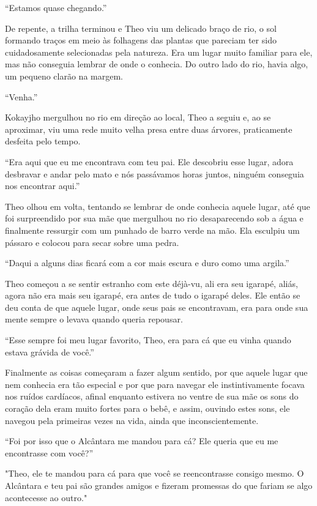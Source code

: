 ``Estamos quase chegando.''

De repente, a trilha terminou e Theo viu um delicado braço de rio, o sol
formando traços em meio às folhagens das plantas que pareciam ter sido
cuidadosamente selecionadas pela natureza. Era um lugar muito familiar
para ele, mas não conseguia lembrar de onde o conhecia. Do outro lado do
rio, havia algo, um pequeno clarão na margem.

``Venha.''

Kokayjho mergulhou no rio em direção ao local, Theo a seguiu e, ao se
aproximar, viu uma rede muito velha presa entre duas árvores,
praticamente desfeita pelo tempo.

``Era aqui que eu me encontrava com teu pai. Ele descobriu esse lugar,
adora desbravar e andar pelo mato e nós passávamos horas juntos, ninguém
conseguia nos encontrar aqui.''

Theo olhou em volta, tentando se lembrar de onde conhecia aquele lugar,
até que foi surpreendido por sua mãe que mergulhou no rio desaparecendo
sob a água e finalmente ressurgir com um punhado de barro verde na mão.
Ela esculpiu um pássaro e colocou para secar sobre uma pedra.

``Daqui a alguns dias ficará com a cor mais escura e duro como uma
argila.''

Theo começou a se sentir estranho com este déjà-vu, ali era seu igarapé,
aliás, agora não era mais seu igarapé, era antes de tudo o igarapé
deles. Ele então se deu conta de que aquele lugar, onde seus pais se
encontravam, era para onde sua mente sempre o levava quando queria
repousar.

``Esse sempre foi meu lugar favorito, Theo, era para cá que eu vinha
quando estava grávida de você.''

Finalmente as coisas começaram a fazer algum sentido, por que aquele
lugar que nem conhecia era tão especial e por que para navegar ele
instintivamente focava nos ruídos cardíacos, afinal enquanto estivera no
ventre de sua mãe os sons do coração dela eram muito fortes para o bebê,
e assim, ouvindo estes sons, ele navegou pela primeiras vezes na vida,
ainda que inconscientemente.

``Foi por isso que o Alcântara me mandou para cá? Ele queria que eu me
encontrasse com você?''

"Theo, ele te mandou para cá para que você se reencontrasse consigo
mesmo. O Alcântara e teu pai são grandes amigos e fizeram promessas do
que fariam se algo acontecesse ao outro."

